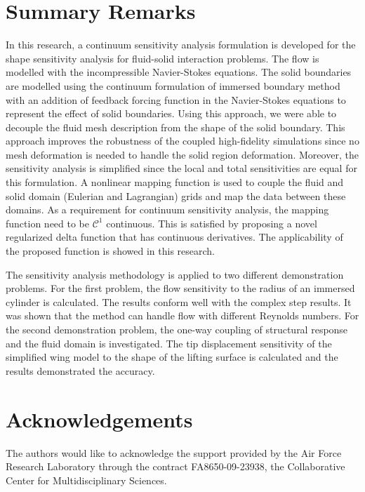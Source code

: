 \documentclass[12pt]{aiaa-pretty}
\begin{document}
\section{Summary Remarks}
In this research, a continuum sensitivity analysis formulation is developed for the shape sensitivity analysis for fluid-solid interaction problems. The flow is modelled with the incompressible Navier-Stokes equations. The solid boundaries are modelled using the continuum formulation of immersed boundary method with an addition of feedback forcing function in the Navier-Stokes equations to represent the effect of solid boundaries. Using this approach, we were able to decouple the fluid mesh description from the shape of the solid boundary. This approach improves the robustness of the coupled high-fidelity simulations since no mesh deformation is needed to handle the solid region deformation. Moreover, the sensitivity analysis is simplified since the local and total sensitivities are equal for this formulation. A nonlinear mapping function is used to couple the fluid and solid domain (Eulerian and Lagrangian) grids and map the data between these domains. As a requirement for continuum sensitivity analysis, the mapping function need to be $\mathcal{C}^1$ continuous. This is satisfied by proposing a novel regularized delta function that has continuous derivatives. The applicability of the proposed function is showed in this research.

The sensitivity analysis methodology is applied to two different demonstration problems. For the first problem, the flow sensitivity to the radius of an immersed cylinder is calculated. The results conform well with the complex step results. It was shown that the method can handle flow with different Reynolds numbers. For the second demonstration problem, the one-way coupling of structural response and the fluid domain is investigated. The tip displacement sensitivity of the simplified wing model to the shape of the lifting surface is calculated and the results demonstrated the accuracy.
\section*{Acknowledgements}
The authors would like to acknowledge the support provided by the Air Force Research Laboratory through the contract FA8650-09-23938, the Collaborative Center for Multidisciplinary Sciences.


\end{document}

